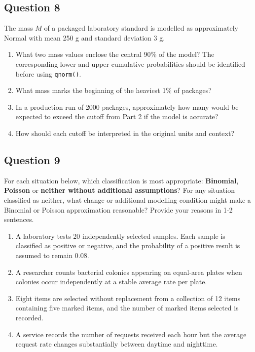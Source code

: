 \documentclass[10pt,letterpaper]{article}
\providecommand{\tightlist}{%
  \setlength{\itemsep}{0pt}\setlength{\parskip}{0pt}}
\newcommand{\passthrough}[1]{#1}
\begin{document}
\subsection*{Question 8} 
The mass \(M\) of a packaged laboratory standard is modelled as approximately Normal with mean 250 g and standard deviation 3 g.

\begin{enumerate}
\def\labelenumi{\arabic{enumi}.}
\tightlist
	\item What two mass values enclose the central 90\% of the model? The corresponding lower and upper cumulative probabilities should be identified before using \passthrough{\lstinline!qnorm()!}.
	\item What mass marks the beginning of the heaviest 1\% of packages?
	\item In a production run of 2000 packages, approximately how many would be expected to exceed the cutoff from Part 2 if the model is accurate?
	\item How should each cutoff be interpreted in the original units and context?
\end{enumerate}

\newpage

\subsection*{Question 9}
For each situation below, which classification is most appropriate: \textbf{Binomial}, \textbf{Poisson} or \textbf{neither without additional assumptions}? For any situation classified as neither, what change or additional modelling condition might make a Binomial or Poisson approximation reasonable? Provide your reasons in 1-2 sentences.

\begin{enumerate}
\def\labelenumi{\arabic{enumi}.}
\tightlist
	\item A laboratory tests 20 independently selected samples. Each sample is classified as positive or negative, and the probability of a positive result is assumed to remain 0.08.
	\item A researcher counts bacterial colonies appearing on equal-area plates when colonies occur independently at a stable average rate per plate.
	\item Eight items are selected without replacement from a collection of 12 items containing five marked items, and the number of marked items selected is recorded.
	\item A service records the number of requests received each hour but the average request rate changes substantially between daytime and nighttime.
\end{enumerate}
\end{document}
